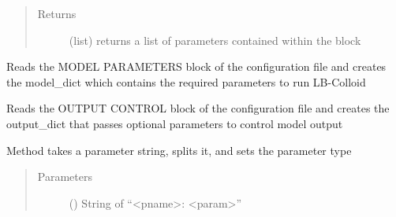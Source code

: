 \documentclass[letterpaper,10pt,english]{sphinxmanual}
\begin{document}
\begin{fulllineitems}
\begin{fulllineitems}
\begin{quote}
\begin{description}
\end{description}\end{quote}
\begin{quote}\begin{description}
\item[{Returns}] \leavevmode
(list) returns a list of parameters contained within the block

\end{description}\end{quote}

\end{fulllineitems}


\begin{fulllineitems}
\label{\detokenize{index:lb_colloids.Colloids.Colloid_IO.Config.model_parameters}}
Reads the MODEL PARAMETERS block of the configuration file and creates
the model\_dict which contains the required parameters to run LB-Colloid

\end{fulllineitems}


\begin{fulllineitems}
\label{\detokenize{index:lb_colloids.Colloids.Colloid_IO.Config.output_control}}
Reads the OUTPUT CONTROL block of the configuration file and creates
the output\_dict that passes optional parameters to control model output

\end{fulllineitems}


\begin{fulllineitems}
\label{\detokenize{index:lb_colloids.Colloids.Colloid_IO.Config.parametertype}}
Method takes a parameter string, splits it, and sets the parameter type
\begin{quote}\begin{description}
\item[{Parameters}] \leavevmode
{} () \textendash{} String of “\textless{}pname\textgreater{}: \textless{}param\textgreater{}”


\end{description}
\end{quote}
\end{fulllineitems}
\end{fulllineitems}
\end{document}
